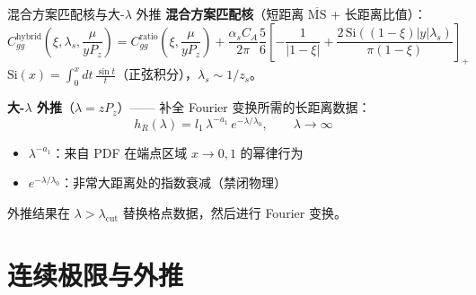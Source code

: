 \documentclass[10pt,aspectratio=169]{beamer}
\newcommand{\msbar}{\overline{\mathrm{MS}}}
\newcommand{\alphas}{\alpha_s}
\newcommand{\Pz}{P_z}
\newcommand{\CA}{C_A}
\begin{document}
\begin{frame}{混合方案匹配核与大-$\lambda$ 外推}
\small
\textbf{混合方案匹配核}（短距离 $\msbar$ + 长距离比值）：
\begin{equation}
  \boxed{
  C^{\text{hybrid}}_{gg}\!\left(\xi, \lambda_s, \frac{\mu}{y\Pz}\right) =
  C^{\text{ratio}}_{gg}\!\left(\xi, \frac{\mu}{y\Pz}\right)
  + \frac{\alphas\CA}{2\pi}\frac{5}{6}
  \left[-\frac{1}{|1-\xi|} + \frac{2\,\mathrm{Si}((1-\xi)|y|\lambda_s)}{\pi(1-\xi)}\right]_+
  }
\end{equation}
$\mathrm{Si}(x) = \int_0^x dt\,\frac{\sin t}{t}$（正弦积分），$\lambda_s \sim 1/z_s$。

\textbf{大-$\lambda$ 外推}（$\lambda = z\Pz$）—— 补全 Fourier 变换所需的长距离数据：
\begin{equation}
  \boxed{
  h_R(\lambda) = l_1\,\lambda^{-a_1}\,e^{-\lambda/\lambda_0},\qquad \lambda \to \infty
  }
\end{equation}
\begin{itemize}
  \item $\lambda^{-a_1}$：来自 PDF 在端点区域 $x \to 0,1$ 的幂律行为
  \item $e^{-\lambda/\lambda_0}$：非常大距离处的指数衰减（禁闭物理）
\end{itemize}

外推结果在 $\lambda > \lambda_{\text{cut}}$ 替换格点数据，然后进行 Fourier 变换。
\end{frame}

\section{连续极限与外推}
\end{document}
